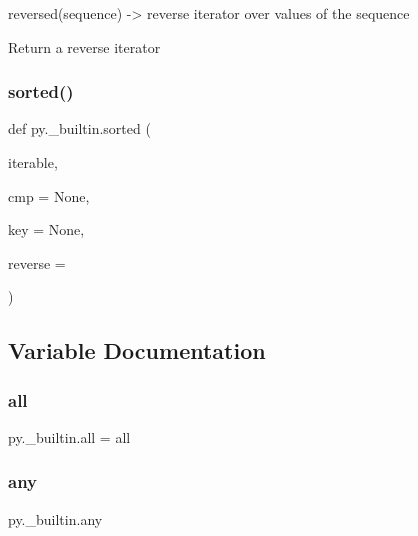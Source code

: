 \begin{DoxyVerb}reversed(sequence) -> reverse iterator over values of the sequence

Return a reverse iterator
\end{DoxyVerb}
 \mbox{\label{namespacepy_1_1__builtin_aa08168667a2fbab4583371173cbc6e85}} 
\subsubsection{\texorpdfstring{sorted()}{sorted()}}
{\footnotesize\ttfamily def py.\+\_\+builtin.\+sorted (\begin{DoxyParamCaption}\item[{}]{iterable,  }\item[{}]{cmp = {\ttfamily None},  }\item[{}]{key = {\ttfamily None},  }\item[{}]{reverse = {} }\end{DoxyParamCaption})}



\subsection{Variable Documentation}
\mbox{\label{namespacepy_1_1__builtin_ac5441a4a5f24ac5b9c8b9924cf745830}} 
\subsubsection{\texorpdfstring{all}{all}}
{\footnotesize\ttfamily py.\+\_\+builtin.\+all = all}

\mbox{\label{namespacepy_1_1__builtin_a2c6699e227d28c411f49d5d6f8e260ce}} 
\subsubsection{\texorpdfstring{any}{any}}
{\footnotesize\ttfamily py.\+\_\+builtin.\+any}

